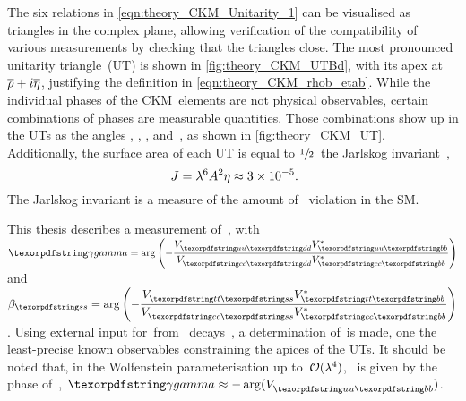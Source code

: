 The six relations in \cref{eqn:theory_CKM_Unitarity_1} can be visualised as triangles in the complex plane, allowing verification of the compatibility of various measurements by checking that the triangles close.
The most pronounced unitarity triangle~(UT) is shown in \cref{fig:theory_CKM_UTBd}, with its apex at~\({\overline{\rho} + i\overline{\eta}}\), justifying the definition in \cref{eqn:theory_CKM_rhob_etab}.
While the individual phases of the CKM~elements are not physical observables, certain combinations of phases are measurable quantities.
Those combinations show up in the UTs as the angles \CPalpha, \CPbeta, \CPgamma, and~\betas, as shown in \cref{fig:theory_CKM_UT}.
Additionally, the surface area of each UT is equal to \(\sfrac{1}{2}\)~the Jarlskog invariant~\Jarlskog,~\cite{PhysRevLett.55.1039}
%
\begin{equation} \label{eqn:theory_CKM_Jarlskog}
    \Jarlskog = \wolfl^{6}\wolfA^{2}\wolfeta \approx \num{3e-5}\rlap{.}
\end{equation}
%
The Jarlskog invariant is a measure of the amount of \CP~violation in the SM.

This thesis describes a measurement of~\weak, with \({\CPgamma = \arg\left(-\dfrac{\Vud\Vubs}{\Vcd\Vcbs}\right)}\) and~\({\betas = \arg\left(-\dfrac{\Vts\Vtbs}{\Vcs\Vcbs}\right)}\).
Using external input for~\betas from \BsToJPsiPhi~decays~\cite{HFLAV2016}, a determination of~\CPgamma is made, one the least-precise known observables constraining the apices of the UTs.
It should be noted that, in the Wolfenstein parameterisation up to~\({{\mathcal{O}}(\lambda^{4})}\), \CPgamma~is given by the phase of~\Vub, \({\CPgamma \approx -\arg(\Vub)}\).


